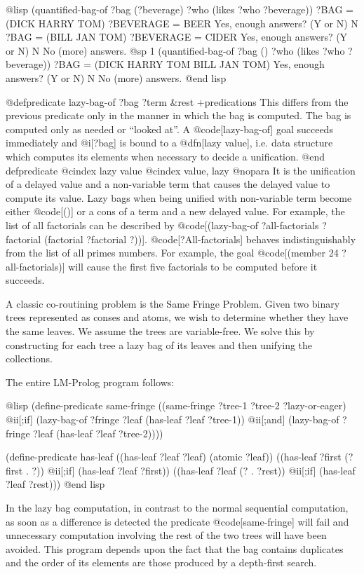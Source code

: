 {@lisp
(quantified-bag-of ?bag (?beverage) ?who (likes ?who ?beverage))
?BAG = (DICK HARRY TOM)
?BEVERAGE = BEER
Yes, enough answers? (Y or N) N
?BAG = (BILL JAN TOM)
?BEVERAGE = CIDER
Yes, enough answers? (Y or N) N
No (more) answers.
@sp 1
(quantified-bag-of ?bag () ?who (likes ?who ?beverage))
?BAG = (DICK HARRY TOM BILL JAN TOM)
Yes, enough answers? (Y or N) N
No (more) answers.
@end lisp

@defpredicate lazy-bag-of ?bag ?term &rest +predications
This differs from the previous predicate only in the manner in which the bag is
computed. 
The bag is computed only as needed or ``looked at''.
A @code[lazy-bag-of] goal succeeds immediately and @i[?bag] is bound
to a @dfn[lazy value], 
i.e. data structure which computes its elements when necessary to decide a
unification.
@end defpredicate
@cindex lazy value
@cindex value, lazy
@nopara
It is the unification of a delayed value and a non-variable term that
causes the delayed value to compute its value.  Lazy bags when being
unified with non-variable term become either @code[()] or a cons of a
term and a new delayed value.  For example, the list of all factorials
can be described by
@code[(lazy-bag-of ?all-factorials ?factorial (factorial ?factorial ?))].
@code[?All-factorials] behaves indistinguishably from the list of all primes
numbers. 
For example, the goal @code[(member 24 ?all-factorials)] will cause the
first five factorials to be computed before it succeeds.

A classic co-routining problem is the Same Fringe Problem.
Given two binary trees represented as conses and atoms,
we wish to determine whether they have the same leaves. 
We assume the trees are variable-free.
We solve this by constructing for each tree a lazy bag of its leaves and
then unifying the collections.

The entire LM-Prolog program follows: 

@lisp
(define-predicate same-fringe
  ((same-fringe ?tree-1 ?tree-2 ?lazy-or-eager) @ii[;if]
   (lazy-bag-of ?fringe ?leaf (has-leaf ?leaf ?tree-1)) @ii[;and]
   (lazy-bag-of ?fringe ?leaf (has-leaf ?leaf ?tree-2))))

(define-predicate has-leaf
  ((has-leaf ?leaf ?leaf)
   (atomic ?leaf))
  ((has-leaf ?first (?first . ?)) @ii[;if]
   (has-leaf ?leaf ?first))
  ((has-leaf ?leaf (? . ?rest)) @ii[;if]
   (has-leaf ?leaf ?rest)))
@end lisp

In the lazy bag computation, in contrast to the normal sequential
computation, as soon as a difference is detected the predicate
@code[same-fringe] will fail and unnecessary computation involving the
rest of the two trees will have been avoided.  This program depends
upon the fact that the bag contains duplicates and the order of its
elements are those produced by a depth-first search.

}
